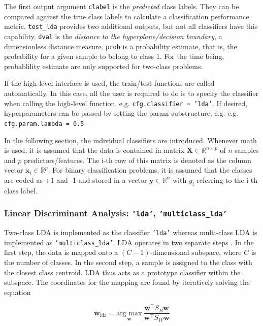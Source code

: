 \documentclass[utf8]{frontiersSCNS} %
\newcommand{\w}{\mathbf{w}}
\newcommand{\x}{\mathbf{x}}
\newcommand{\R}{\mathbb{R}}
\newcommand{\X}{\mathbf{X}}
\newcommand{\ttt}[1]{\texttt{#1}}
\begin{document}
The first output argument \ttt{clabel} is the \textit{predicted} class labels. They can be compared against the true class labels to calculate a classification performance metric. \ttt{test\_lda} provides two additional outputs, but not all classifiers have this capability. \ttt{dval} is the \textit{distance to the hyperplane/decision boundary}, a dimensionless distance measure. \ttt{prob} is a probability estimate, that is, the probability for a given sample to belong to class 1. For the time being, probablility estimate are only supported for two-class problems.

If the high-level interface is used, the train/test functions are called  automatically. In this case, all the user is required to do is to specify the classifier when calling the high-level function, e.g. \ttt{cfg.classifier = 'lda'}. If desired, hyperparameters can be passed by setting the param substructure, e.g.  e.g. \ttt{cfg.param.lambda = 0.5}.

In the following section, the individual classifiers are introduced. Whenever math is used, it is assumed that the data is contained in matrix $\X\in\R^{n \times p}$ of $n$ samples and $p$ predictors/features. The i-th row of this matrix is denoted as the column vector $\x_i\in\R^p$. For binary classification problems, it is assumed that the classes are coded as +1 and -1 and stored in a vector $\mathbf{y}\in\R^n$ with $y_i$ referring to the i-th class label.

\subsubsection{Linear Discriminant Analysis: \ttt{'lda'}, \ttt{'multiclass\_lda'}}

Two-class LDA is implemented as the classifier \ttt{'lda'} whereas multi-class LDA is implemented as \texttt{'multiclass\_lda'}. LDA operates in two separate steps \cite{Fisher1936}. In the first step, the data is mapped onto a $(C-1)$-dimensional subspace, where $C$ is the number of classes. In the second step, a sample is assigned to the class with the closest class centroid. LDA thus acts as a prototype classifier within the subspace. The coordinates for the mapping are found by iteratively solving the equation

\begin{equation}
\label{eq:fda}
\w_{\text{lda}} = \underset{\w}{\text{arg max}}\ \frac{\w^\top S_B\w}{\w^\top S_W\w}
\end{equation}
\end{document}
